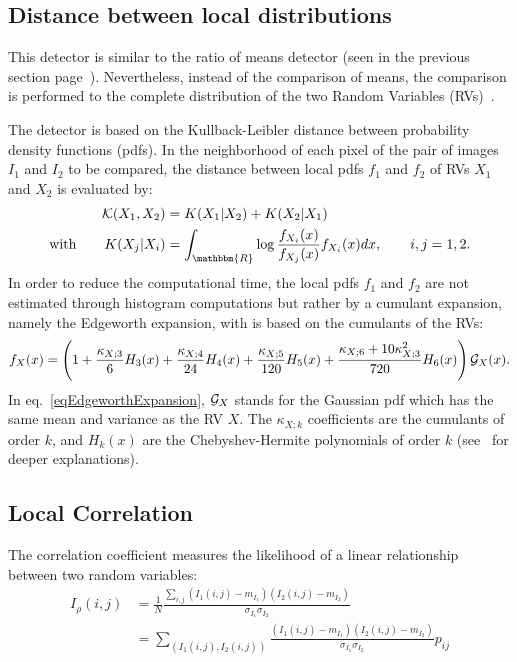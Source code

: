 \subsection{Distance between local distributions}
\label{sec:KullbackLeiblerDistance}

This detector is similar to the ratio of means detector (seen in the 
previous section page~\pageref{sec:RatioOfMeans}). Nevertheless, 
instead of the comparison of means, the comparison is performed to
the complete distribution of the two Random Variables (RVs)~\cite{Inglada03}.

The detector is based on the Kullback-Leibler distance between probability 
density functions (pdfs). In the neighborhood of each pixel of the pair 
of images $I_1$ and $I_2$ to be compared, the distance between local pdfs 
$f_1$ and $f_2$ of RVs $X_1$ and $X_2$ is evaluated by:
\begin{align}
  {\cal K}(X_1,X_2) &= K(X_1|X_2) + K(X_2|X_1) \\
  \text{with} \qquad
  K(X_j | X_i) &= \int_{\mathbbm{R}} 
      \log \frac{f_{X_i}(x)}{f_{X_j}(x)} f_{X_i}(x) dx,\qquad i,j=1,2.
\end{align}
In order to reduce the computational time, the local pdfs $f_1$ and $f_2$ 
are not estimated through histogram computations but rather by a cumulant
expansion, namely the Edgeworth expansion, with is based on the 
cumulants of the RVs:
\begin{equation}\label{eqEdgeworthExpansion}
f_X(x) = \left( 1 + \frac{\kappa_{X;3}}{6} H_3(x) 
					+ \frac{\kappa_{X;4}}{24} H_4(x)
					+ \frac{\kappa_{X;5}}{120} H_5(x)
					+ \frac{\kappa_{X;6}+10 \kappa_{X;3}^2}{720} H_6(x) \right) {\cal G}_X(x).
\end{equation}
In eq.~\eqref{eqEdgeworthExpansion}, ${\cal G}_X$ stands for the Gaussian pdf
which has the same mean and variance as the RV $X$. The $\kappa_{X;k}$
coefficients are the cumulants of order $k$, and $H_k(x)$ are the 
Chebyshev-Hermite polynomials of order $k$ (see~\cite{Inglada07} for deeper
explanations).



\subsection{Local Correlation}
\label{sec:LocalCorrelation}
The correlation coefficient measures the likelihood of a linear
relationship between two random variables:
\begin{equation}
\begin{split}
I_\rho(i,j) &= \frac{1}{N}\frac{\sum_{i,j}(I_1(i,j)-m_{I_1})(I_2(i,j)-m_{I_2})}{\sigma_{I_1}
\sigma_{I_2}}\\
& = \sum_{(I_1(i,j),I_2(i,j))}\frac{(I_1(i,j)-m_{I_1})(I_2(i,j)-m_{I_2})}{\sigma_{I_1}
\sigma_{I_2}}p_{ij}
\end{split}
\end{equation}

